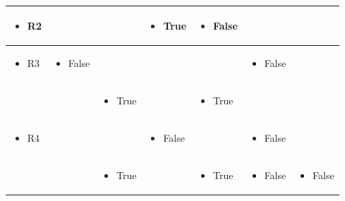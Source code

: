 \documentclass[11pt,a4paper]{article}
\begin{document}
\begin{table}[h]
\begin{tabular}{|l|l|l|l|l|l|l|}
\begin{itemize} \item R2 \end{itemize} &  &  & \begin{itemize} \item True \end{itemize} & \begin{itemize} \item False \end{itemize} &  &  \\ \hline
\begin{itemize} \item R3 \end{itemize} & \begin{itemize} \item False \end{itemize} &  &  &  & \begin{itemize} \item False \end{itemize} &  \\ \hline
 &  & \begin{itemize} \item True \end{itemize} &  & \begin{itemize} \item True \end{itemize} &  &  \\ \hline
\begin{itemize} \item R4 \end{itemize} &  &  & \begin{itemize} \item False \end{itemize} &  & \begin{itemize} \item False \end{itemize} &  \\ \hline
 &  & \begin{itemize} \item True \end{itemize} &  & \begin{itemize} \item True \end{itemize} & \begin{itemize} \item False \end{itemize} & \begin{itemize} \item False \end{itemize} \\ \hline

\end{tabular}
\end{table}
\end{document}

